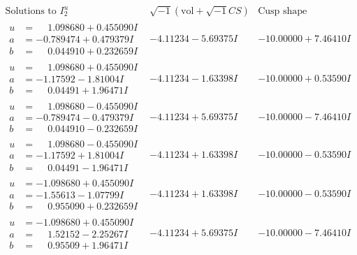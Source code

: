 \documentclass[1p]{elsarticle_modified}
\theoremstyle{definition}
\newcommand{\I}{\sqrt{-1}}
\begin{document}
$$\begin{array}{c|c|c}  
\text{Solutions to }I^u_{2}& \I (\text{vol} + \sqrt{-1}CS) & \text{Cusp shape}\\
 \hline 
\begin{aligned}
u &= \phantom{-}1.098680 + 0.455090 I \\
a &= -0.789474 + 0.479379 I \\
b &= \phantom{-}0.044910 + 0.232659 I\end{aligned}
 & -4.11234 - 5.69375 I & -10.00000 + 7.46410 I \\ \hline\begin{aligned}
u &= \phantom{-}1.098680 + 0.455090 I \\
a &= -1.17592 - 1.81004 I \\
b &= \phantom{-}0.04491 + 1.96471 I\end{aligned}
 & -4.11234 - 1.63398 I & -10.00000 + 0.53590 I \\ \hline\begin{aligned}
u &= \phantom{-}1.098680 - 0.455090 I \\
a &= -0.789474 - 0.479379 I \\
b &= \phantom{-}0.044910 - 0.232659 I\end{aligned}
 & -4.11234 + 5.69375 I & -10.00000 - 7.46410 I \\ \hline\begin{aligned}
u &= \phantom{-}1.098680 - 0.455090 I \\
a &= -1.17592 + 1.81004 I \\
b &= \phantom{-}0.04491 - 1.96471 I\end{aligned}
 & -4.11234 + 1.63398 I & -10.00000 - 0.53590 I \\ \hline\begin{aligned}
u &= -1.098680 + 0.455090 I \\
a &= -1.55613 - 1.07799 I \\
b &= \phantom{-}0.955090 + 0.232659 I\end{aligned}
 & -4.11234 + 1.63398 I & -10.00000 - 0.53590 I \\ \hline\begin{aligned}
u &= -1.098680 + 0.455090 I \\
a &= \phantom{-}1.52152 - 2.25267 I \\
b &= \phantom{-}0.95509 + 1.96471 I\end{aligned}
 & -4.11234 + 5.69375 I & -10.00000 - 7.46410 I \\ \hline\begin{aligned}

\end{aligned}
\end{array}$$
\end{document}

